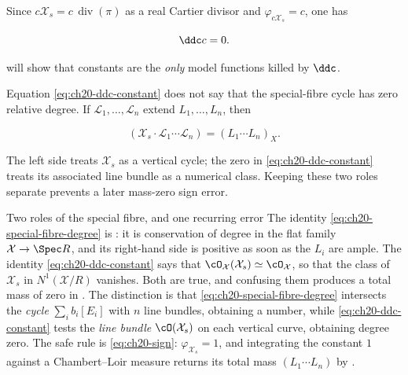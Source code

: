 Since $c\mathcal X_s=c\,\operatorname{div}(\pi)$ as
a real Cartier divisor and $\varphi_{c\mathcal X_s}=c$, one has

\begin{equation}
\label{eq:ch20-ddc-constant}
                            \ddc c=0.
\end{equation}

 will show that constants are the \emph{only}
model functions killed by $\ddc$.

Equation \eqref{eq:ch20-ddc-constant} does not say that the special-fibre
cycle has zero relative degree.  If
$\mathcal L_1,\ldots,\mathcal L_n$ extend $L_1,\ldots,L_n$, then

\begin{equation}
\label{eq:ch20-special-fibre-degree}
 (\mathcal X_s\cdot\mathcal L_1\cdots\mathcal L_n)
                  =(L_1\cdots L_n)_X.
\end{equation}

The left side treats $\mathcal X_s$ as a vertical cycle; the zero in
\eqref{eq:ch20-ddc-constant} treats its associated line bundle as a
numerical class.  Keeping these two roles separate prevents a later
mass-zero sign error.

\noindent\begin{minipage}{\textwidth}
\begin{warning}{Two roles of the special fibre, and one recurring error}
The identity \eqref{eq:ch20-special-fibre-degree} is
: it is conservation of degree in the flat
family $\mathcal X\to\Spec R$, and its right-hand side is positive as soon
as the $L_i$ are ample.  The identity \eqref{eq:ch20-ddc-constant} says
that $\cO_{\mathcal X}(\mathcal X_s)\simeq\cO_{\mathcal X}$, so that the
class of $\mathcal X_s$ in $N^1(\mathcal X/R)$ vanishes.  Both are true,
and confusing them produces a total mass of zero in
.  The distinction is that
\eqref{eq:ch20-special-fibre-degree} intersects the \emph{cycle}
$\sum_ib_i[E_i]$ with $n$ line bundles, obtaining a number, while
\eqref{eq:ch20-ddc-constant} tests the \emph{line bundle}
$\cO(\mathcal X_s)$ on each vertical curve, obtaining degree zero.
The safe rule is \eqref{eq:ch20-sign}: $\varphi_{\mathcal X_s}=1$,
and integrating the constant $1$ against a Chambert--Loir measure returns
its total mass $(L_1\cdots L_n)$ by
.
\end{warning}
\end{minipage}\par

